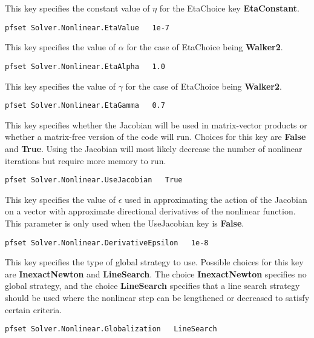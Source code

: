 {This key specifies the constant value of $\eta$ for the EtaChoice key
{\bf EtaConstant}.
}
\begin{display}\begin{verbatim}
pfset Solver.Nonlinear.EtaValue   1e-7
\end{verbatim}\end{display}

{This key specifies the value of $\alpha$ for the case of EtaChoice being 
{\bf Walker2}. 
}
\begin{display}\begin{verbatim}
pfset Solver.Nonlinear.EtaAlpha   1.0
\end{verbatim}\end{display}

{This key specifies the value of $\gamma$ for the case of EtaChoice being
{\bf Walker2}.
}
\begin{display}\begin{verbatim}
pfset Solver.Nonlinear.EtaGamma   0.7
\end{verbatim}\end{display}

{This key specifies whether the Jacobian will be used in matrix-vector products
or whether a matrix-free version of the code will run.  Choices for this key 
are {\bf False} and {\bf True}.
Using the Jacobian will most likely decrease the number of nonlinear iterations
but require more memory to run.
}
\begin{display}\begin{verbatim}
pfset Solver.Nonlinear.UseJacobian   True
\end{verbatim}\end{display}

{This key specifies the value of $\epsilon$ used in approximating the action of
the Jacobian on a vector with approximate directional derivatives of the
nonlinear function.  This parameter is only used when the UseJacobian key is
{\bf False}.
}
\begin{display}\begin{verbatim}
pfset Solver.Nonlinear.DerivativeEpsilon   1e-8
\end{verbatim}\end{display}

{This key specifies the type of global strategy to use.  Possible choices for
this key are {\bf InexactNewton} and {\bf LineSearch}.  The choice {\bf
InexactNewton} specifies no global strategy, and the choice {\bf LineSearch}
specifies that a line search strategy should be used where the nonlinear step
can be lengthened or decreased to satisfy certain criteria.
}
\begin{display}\begin{verbatim}
pfset Solver.Nonlinear.Globalization   LineSearch
\end{verbatim}\end{display}

